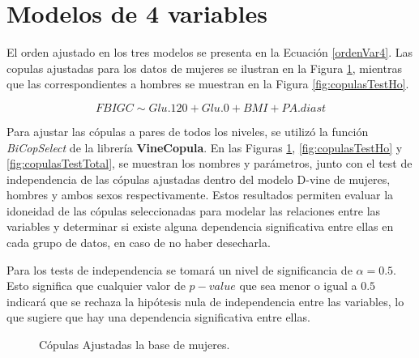 
\section{Modelos de 4 variables}

El orden ajustado en los tres modelos se presenta en la Ecuación \eqref{ordenVar4}. Las copulas ajustadas para los datos de mujeres se ilustran en la Figura \ref{fig:copulasTestMu}, mientras que las correspondientes a hombres se muestran en la Figura \ref{fig:copulasTestHo}.

\begin{equation}\label{ordenVar4}
     FBIGC \sim Glu.120 + Glu.0 + BMI + PA.diast
\end{equation}

Para ajustar las cópulas a pares de todos los niveles, se utilizó la función \textit{BiCopSelect} de la librería \textbf{VineCopula}. En las Figuras  \ref{fig:copulasTestMu}, \ref{fig:copulasTestHo} y \ref{fig:copulasTestTotal}, se muestran los nombres y parámetros, junto con el test de independencia de las cópulas ajustadas dentro del modelo D-vine de mujeres, hombres y ambos sexos respectivamente. Estos resultados permiten evaluar la idoneidad de las cópulas seleccionadas para modelar las relaciones entre las variables y determinar si existe alguna dependencia significativa entre ellas en cada grupo de datos, en caso de no haber desecharla. 

Para los tests de independencia se tomará un nivel de significancia de $\alpha = 0.5$. Esto significa que cualquier valor de $p-value$ que sea menor o igual a $0.5$ indicará que se rechaza la hipótesis nula de independencia entre las variables, lo que sugiere que hay una dependencia significativa entre ellas.

\begin{figure}[H]
 \centering
    \caption{Cópulas Ajustadas la base de mujeres.}
    \label{fig:copulasTestMu}
\end{figure}

